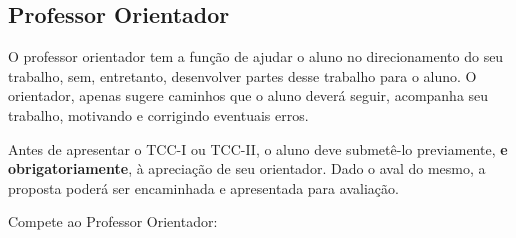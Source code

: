 \subsection{Professor Orientador}

O professor orientador tem a função de ajudar o aluno no direcionamento do seu trabalho, sem, entretanto, desenvolver partes desse 
trabalho para o aluno. O orientador, apenas sugere caminhos que o aluno deverá seguir, acompanha seu trabalho, motivando e corrigindo eventuais erros.

Antes de apresentar o TCC-I ou TCC-II, o aluno deve submetê-lo previamente, \textbf{e obrigatoriamente}, à apreciação de seu orientador. 
Dado o aval do mesmo, a proposta poderá ser encaminhada e apresentada para avaliação.

Compete ao Professor Orientador:

